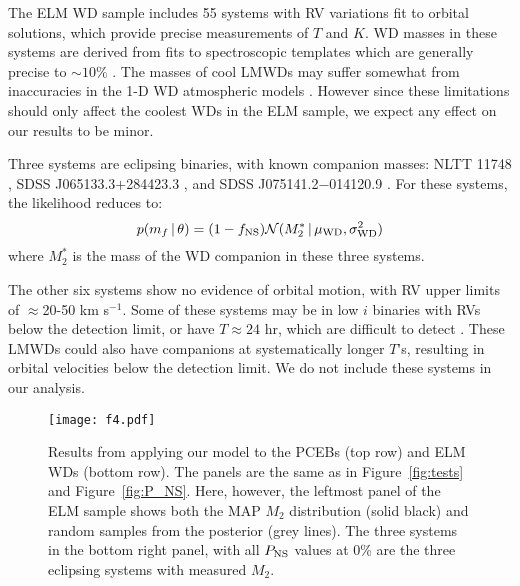 \documentclass[apjl]{emulateapj}
\newcommand{\given}{\,|\,}
\newcommand{\Msun}{\ifmmode {{\rm M}_{\odot}}\else M$_{\odot}$\fi}
\newcommand{\period}{T}
\newcommand{\mf}{m_f}
\begin{document}
The ELM WD sample includes 55 systems with RV variations fit to orbital solutions, which provide precise measurements of $\period$ and $K$. WD masses in these systems are derived from fits to spectroscopic templates which are generally precise to $\sim10\%$ \citep{gianninas14}. The masses of cool LMWDs may suffer somewhat from 
inaccuracies in the 1-D WD atmospheric models \citep{tremblay13}. However since these limitations should only affect the coolest WDs in the ELM sample, we expect any effect on our results to be minor.




Three systems are eclipsing binaries, with known companion masses: NLTT 11748 \citep[$M_2=0.72~\Msun$;][]{kaplan14}, SDSS J065133.3$+$284423.3 \citep[$M_2=0.50~\Msun$;][]{brown11b}, and SDSS J075141.2$-$014120.9 \citep[$M_2=0.97~\Msun$;][]{kilic14}. For these systems, the likelihood reduces to:
\begin{equation}
p(\mf \given \theta) = (1-f_{\rm NS}) \mathcal{N}(M_2^* \given \mu_{\rm WD}, \sigma^2_{\rm WD})
\end{equation}
where $M_2^*$ is the mass of the WD companion in these three systems. 

The other six systems show no evidence of orbital motion, with RV upper limits of $\approx$20-50 km s$^{-1}$. Some of these systems may be in low $i$ binaries with RVs below the detection limit, or have $\period\approx24$ hr, which are difficult to detect \citep{ELMV}. These LMWDs could also have companions at systematically longer $\period$'s, resulting in orbital velocities below the detection limit. We do not include these systems in our analysis.

\begin{figure*}[h!]
\begin{center}
\texttt{[image: f4.pdf]}
\caption{Results from applying our model to the PCEBs (top row) and ELM WDs (bottom row). 
The panels are the same as in Figure~\ref{fig:tests} and Figure~\ref{fig:P_NS}. 
Here, however, the leftmost panel of the ELM sample shows both the MAP $M_2$ distribution (solid black) and random samples from the posterior (grey lines). 
The three systems in the bottom right panel, with all $P_{\rm NS}$ values at 0\% are the three eclipsing systems with measured $M_2$.
}
\label{fig:ELM_post}
\end{center}
\end{figure*}
\end{document}
